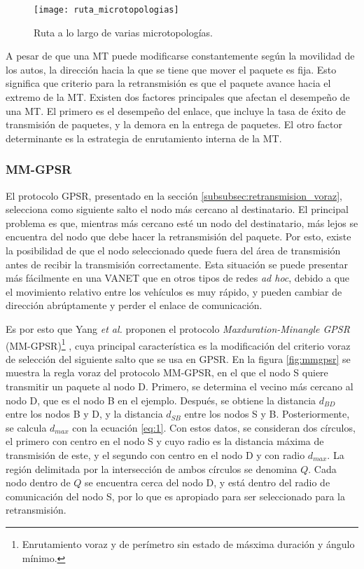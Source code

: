 \begin{figure}[th]
\centering
\texttt{[image: ruta\_microtopologias]}
\decoRule
\caption[Ruta a lo largo de varias microtopologías]{Ruta a lo largo de
varias microtopologías\protect\footnotemark.}
\label{fig:ruta_microtopologias}
\end{figure}


A pesar de que una MT puede modificarse constantemente según la movilidad de los
autos, la dirección hacia la que se tiene que mover el paquete es fija. Esto
significa que criterio para la retransmisión es que el paquete avance hacia el
extremo de la MT. Existen dos factores principales que afectan el desempeño de
una MT. El primero es el desempeño del enlace, que incluye la tasa de éxito de
transmisión de paquetes, y la demora en la entrega de paquetes. El otro factor
determinante es la estrategia de enrutamiento interna de la MT.

\subsubsection{MM-GPSR}
\label{subsubsec:mm_gpsr}

El protocolo GPSR, presentado en la sección \ref{subsubsec:retransmision_voraz},
selecciona como siguiente salto el nodo más cercano al destinatario. El
principal problema es que, mientras más cercano esté un nodo del destinatario,
más lejos se encuentra del nodo que debe hacer la retransmisión del paquete.
Por esto, existe la posibilidad de que el nodo seleccionado quede fuera del área
de transmisión antes de recibir la transmisión correctamente. Esta situación se
puede presentar más fácilmente en una VANET que en otros tipos de redes
\textit{ad hoc}, debido a que el movimiento relativo entre los vehículos es muy
rápido, y pueden cambiar de dirección abrúptamente y perder el enlace de
comunicación.

Es por esto que Yang \textit{et al.} proponen el protocolo
\textit{Maxduration-Minangle GPSR} (MM-GPSR)\footnote{Enrutamiento voraz y de
perímetro sin estado de másxima duración y ángulo mínimo.} \cite{Yang2018},
cuya principal característica es la modificación del criterio voraz de
selección del siguiente salto que se usa en GPSR. En la figura \ref{fig:mmgpsr}
se muestra la regla voraz del protocolo MM-GPSR, en el que el nodo S quiere
transmitir un paquete al nodo D. Primero, se determina el vecino más cercano al
nodo D, que es el nodo B en el ejemplo. Después, se obtiene la distancia
$d_{BD}$ entre los nodos B y D, y la distancia $d_{SB}$ entre los nodos S y B.
Posteriormente, se calcula $d_{max}$ con la ecuación \ref{eq:1}. Con estos
datos, se consideran dos círculos, el primero con centro en el nodo S y cuyo
radio es la distancia máxima de transmisión de este, y el segundo con centro en
el nodo D y con radio $d_{max}$. La región delimitada por la intersección de
ambos círculos se denomina $Q$. Cada nodo dentro de $Q$ se encuentra cerca del
nodo D, y está dentro del radio de comunicación del nodo S, por lo que es
apropiado para ser seleccionado para la retransmisión.


